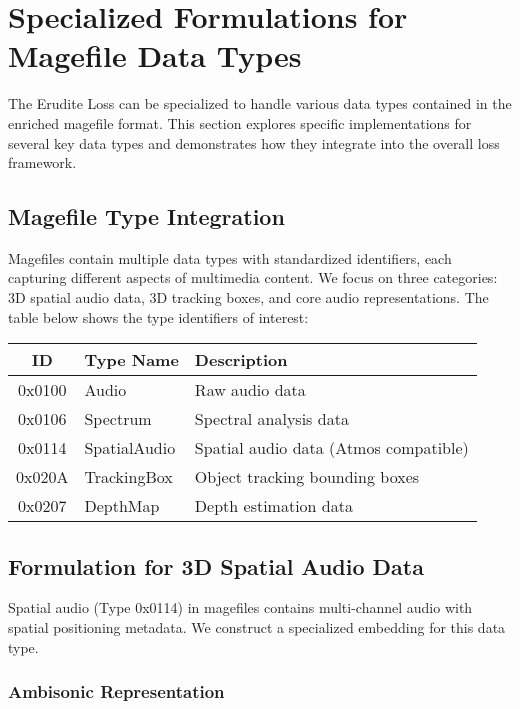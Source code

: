 \section{Specialized Formulations for Magefile Data Types}

The Erudite Loss can be specialized to handle various data types contained in the enriched magefile format. This section explores specific implementations for several key data types and demonstrates how they integrate into the overall loss framework.

\subsection{Magefile Type Integration}

Magefiles contain multiple data types with standardized identifiers, each capturing different aspects of multimedia content. We focus on three categories: 3D spatial audio data, 3D tracking boxes, and core audio representations. The table below shows the type identifiers of interest:

\begin{center}
\begin{tabular}{|c|l|l|}
\hline
\textbf{ID} & \textbf{Type Name} & \textbf{Description} \\
\hline
0x0100 & Audio & Raw audio data \\
0x0106 & Spectrum & Spectral analysis data \\
0x0114 & SpatialAudio & Spatial audio data (Atmos compatible) \\
0x020A & TrackingBox & Object tracking bounding boxes \\
0x0207 & DepthMap & Depth estimation data \\
\hline
\end{tabular}
\end{center}

\subsection{Formulation for 3D Spatial Audio Data}

Spatial audio (Type 0x0114) in magefiles contains multi-channel audio with spatial positioning metadata. We construct a specialized embedding for this data type.

\subsubsection{Ambisonic Representation}

